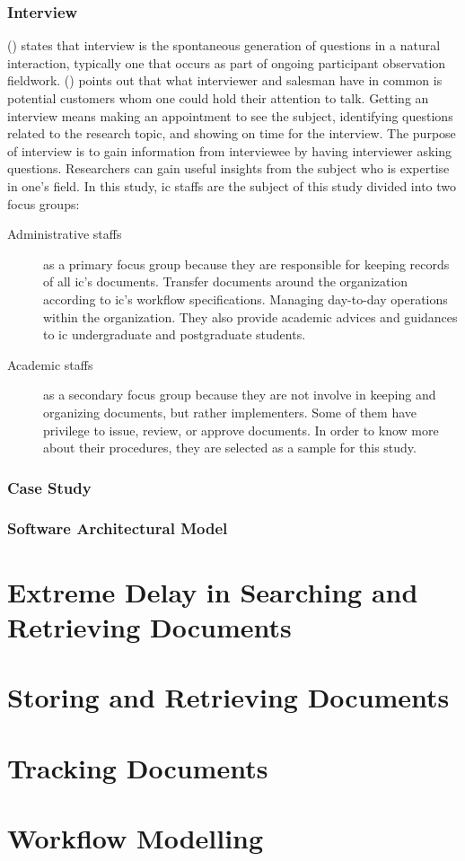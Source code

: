 \subsubsection{Interview}
\citeauthor{gall7j} (\citeyear{gall7j}) states that interview is the spontaneous generation of questions in a natural interaction, typically one that occurs as part of ongoing participant observation fieldwork.
\citeauthor{brady2011craft} (\citeyear{brady2011craft}) points out that what interviewer and salesman have in common is potential customers whom one could hold their attention to talk.
Getting an interview means making an appointment to see the subject, identifying questions related to the research topic, and showing on time for the interview.
The purpose of interview is to gain information from interviewee by having interviewer asking questions.
Researchers can gain useful insights from the subject who is expertise in one's field.
In this study, \gls{ic} staffs are the subject of this study divided into two focus groups:
\begin{description}
	\item [Administrative staffs] as a primary focus group because they are responsible for keeping records of all \gls{ic}'s documents.
	Transfer documents around the organization according to \gls{ic}'s workflow specifications.
	Managing day-to-day operations within the organization.
	They also provide academic advices and guidances to \gls{ic} undergraduate and postgraduate students.
	\item [Academic staffs] as a secondary focus group because they are not involve in keeping and organizing documents, but rather implementers.
	Some of them have privilege to issue, review, or approve documents.
	In order to know more about their procedures, they are selected as a sample for this study.
\end{description}

\subsubsection{Case Study}

\subsubsection{Software Architectural Model}

\section{Extreme Delay in Searching and Retrieving Documents}

\section{Storing and Retrieving Documents}

\section{Tracking Documents}

\section{Workflow Modelling}
